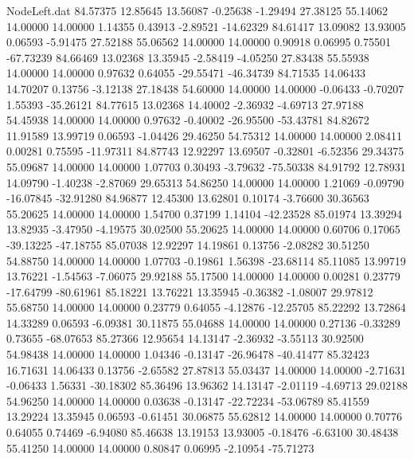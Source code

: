 \begin{filecontents}{NodeLeft.dat}
  84.57375   12.85645   13.56087    -0.25638   -1.29494   27.38125   55.14062   14.00000   14.00000    1.14355    0.43913   -2.89521  -14.62329
  84.61417   13.09082   13.93005     0.06593   -5.91475   27.52188   55.06562   14.00000   14.00000    0.90918    0.06995    0.75501  -67.73239
  84.66469   13.02368   13.35945    -2.58419   -4.05250   27.83438   55.55938   14.00000   14.00000    0.97632    0.64055  -29.55471  -46.34739
  84.71535   14.06433   14.70207     0.13756   -3.12138   27.18438   54.60000   14.00000   14.00000   -0.06433   -0.70207    1.55393  -35.26121
  84.77615   13.02368   14.40002    -2.36932   -4.69713   27.97188   54.45938   14.00000   14.00000    0.97632   -0.40002  -26.95500  -53.43781
  84.82672   11.91589   13.99719     0.06593   -1.04426   29.46250   54.75312   14.00000   14.00000    2.08411    0.00281    0.75595  -11.97311
  84.87743   12.92297   13.69507    -0.32801   -6.52356   29.34375   55.09687   14.00000   14.00000    1.07703    0.30493   -3.79632  -75.50338
  84.91792   12.78931   14.09790    -1.40238   -2.87069   29.65313   54.86250   14.00000   14.00000    1.21069   -0.09790  -16.07845  -32.91280
  84.96877   12.45300   13.62801     0.10174   -3.76600   30.36563   55.20625   14.00000   14.00000    1.54700    0.37199    1.14104  -42.23528
  85.01974   13.39294   13.82935    -3.47950   -4.19575   30.02500   55.20625   14.00000   14.00000    0.60706    0.17065  -39.13225  -47.18755
  85.07038   12.92297   14.19861     0.13756   -2.08282   30.51250   54.88750   14.00000   14.00000    1.07703   -0.19861    1.56398  -23.68114
  85.11085   13.99719   13.76221    -1.54563   -7.06075   29.92188   55.17500   14.00000   14.00000    0.00281    0.23779  -17.64799  -80.61961
  85.18221   13.76221   13.35945    -0.36382   -1.08007   29.97812   55.68750   14.00000   14.00000    0.23779    0.64055   -4.12876  -12.25705
  85.22292   13.72864   14.33289     0.06593   -6.09381   30.11875   55.04688   14.00000   14.00000    0.27136   -0.33289    0.73655  -68.07653
  85.27366   12.95654   14.13147    -2.36932   -3.55113   30.92500   54.98438   14.00000   14.00000    1.04346   -0.13147  -26.96478  -40.41477
  85.32423   16.71631   14.06433     0.13756   -2.65582   27.87813   55.03437   14.00000   14.00000   -2.71631   -0.06433    1.56331  -30.18302
  85.36496   13.96362   14.13147    -2.01119   -4.69713   29.02188   54.96250   14.00000   14.00000    0.03638   -0.13147  -22.72234  -53.06789
  85.41559   13.29224   13.35945     0.06593   -0.61451   30.06875   55.62812   14.00000   14.00000    0.70776    0.64055    0.74469   -6.94080
  85.46638   13.19153   13.93005    -0.18476   -6.63100   30.48438   55.41250   14.00000   14.00000    0.80847    0.06995   -2.10954  -75.71273

\end{filecontents}
